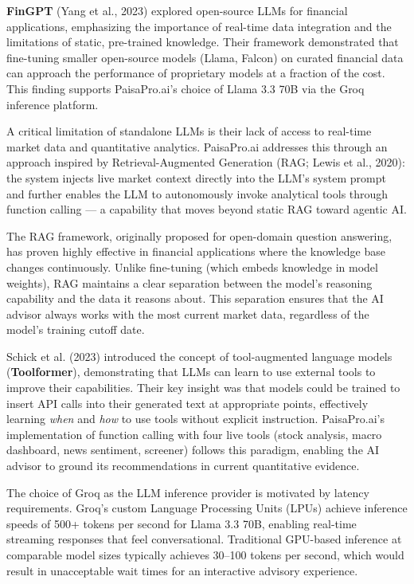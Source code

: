 \documentclass[12pt, a4paper, oneside]{report}
\newcommand{\projectname}{PaisaPro.ai}
\begin{document}
\textbf{FinGPT} (Yang et al., 2023) explored open-source LLMs for financial applications, emphasizing the importance of real-time data integration and the limitations of static, pre-trained knowledge. Their framework demonstrated that fine-tuning smaller open-source models (Llama, Falcon) on curated financial data can approach the performance of proprietary models at a fraction of the cost. This finding supports \projectname{}'s choice of Llama 3.3 70B via the Groq inference platform.

A critical limitation of standalone LLMs is their lack of access to real-time market data and quantitative analytics. \projectname{} addresses this through an approach inspired by Retrieval-Augmented Generation (RAG; Lewis et al., 2020): the system injects live market context directly into the LLM's system prompt and further enables the LLM to autonomously invoke analytical tools through function calling --- a capability that moves beyond static RAG toward agentic AI.

The RAG framework, originally proposed for open-domain question answering, has proven highly effective in financial applications where the knowledge base changes continuously. Unlike fine-tuning (which embeds knowledge in model weights), RAG maintains a clear separation between the model's reasoning capability and the data it reasons about. This separation ensures that the AI advisor always works with the most current market data, regardless of the model's training cutoff date.

Schick et al. (2023) introduced the concept of tool-augmented language models (\textbf{Toolformer}), demonstrating that LLMs can learn to use external tools to improve their capabilities. Their key insight was that models could be trained to insert API calls into their generated text at appropriate points, effectively learning \textit{when} and \textit{how} to use tools without explicit instruction. \projectname{}'s implementation of function calling with four live tools (stock analysis, macro dashboard, news sentiment, screener) follows this paradigm, enabling the AI advisor to ground its recommendations in current quantitative evidence.

The choice of Groq as the LLM inference provider is motivated by latency requirements. Groq's custom Language Processing Units (LPUs) achieve inference speeds of 500+ tokens per second for Llama 3.3 70B, enabling real-time streaming responses that feel conversational. Traditional GPU-based inference at comparable model sizes typically achieves 30--100 tokens per second, which would result in unacceptable wait times for an interactive advisory experience.
\end{document}
